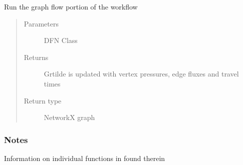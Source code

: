 \documentclass[letterpaper,10pt,english]{sphinxmanual}
\begin{document}
\begin{fulllineitems}
\label{\detokenize{pydfnworks:pydfnworks.dfnGraph.graph_flow.run_graph_flow}}
Run the graph flow portion of the workflow
\begin{quote}\begin{description}
\item[{Parameters}] \leavevmode
{} \textendash{} DFN Class

\item[{Returns}] \leavevmode
{} \textendash{} Grtilde is updated with vertex pressures, edge fluxes and travel times

\item[{Return type}] \leavevmode
NetworkX graph

\end{description}\end{quote}
\subsubsection*{Notes}

Information on individual functions in found therein

\end{fulllineitems}

\end{document}
